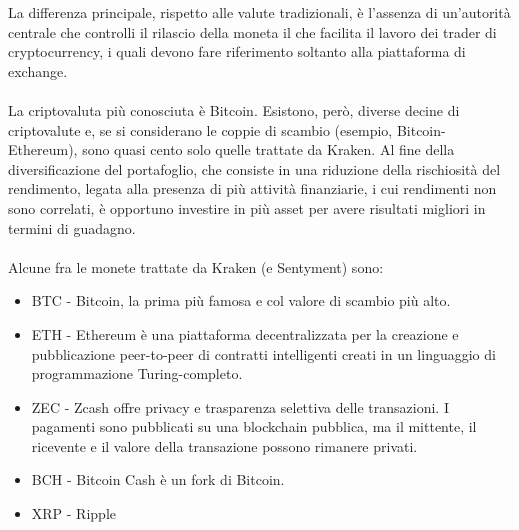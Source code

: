 \documentclass[a4paper,12pt]{report}
\begin{document}
La differenza principale, rispetto alle valute tradizionali, è l'assenza di un'autorità centrale che controlli il rilascio della moneta il che facilita il lavoro dei trader di cryptocurrency, i quali devono fare riferimento soltanto alla piattaforma di exchange.\\~\\ La criptovaluta più conosciuta è Bitcoin. Esistono, però, diverse decine di criptovalute e, se si considerano le coppie di scambio (esempio, Bitcoin-Ethereum), sono quasi cento solo quelle trattate da Kraken. Al fine della diversificazione del portafoglio, che consiste in una riduzione della rischiosità del rendimento, legata alla presenza di più attività finanziarie, i cui rendimenti non sono correlati, è opportuno investire in più asset per avere risultati migliori in termini di guadagno.\\~\\Alcune fra le monete trattate da Kraken (e Sentyment) sono:
\begin{itemize}
	\item BTC - Bitcoin, la prima più famosa e col valore di scambio più alto.
	\item ETH - Ethereum è una piattaforma decentralizzata per la creazione e pubblicazione peer-to-peer di contratti intelligenti creati in un linguaggio di programmazione Turing-completo.
	\item ZEC - Zcash offre privacy e trasparenza selettiva delle transazioni. I pagamenti sono pubblicati su una blockchain pubblica, ma il mittente, il ricevente e il valore della transazione possono rimanere privati.
	\item BCH - Bitcoin Cash è un fork di Bitcoin.
	\item XRP - Ripple
\end{itemize}
\end{document}

